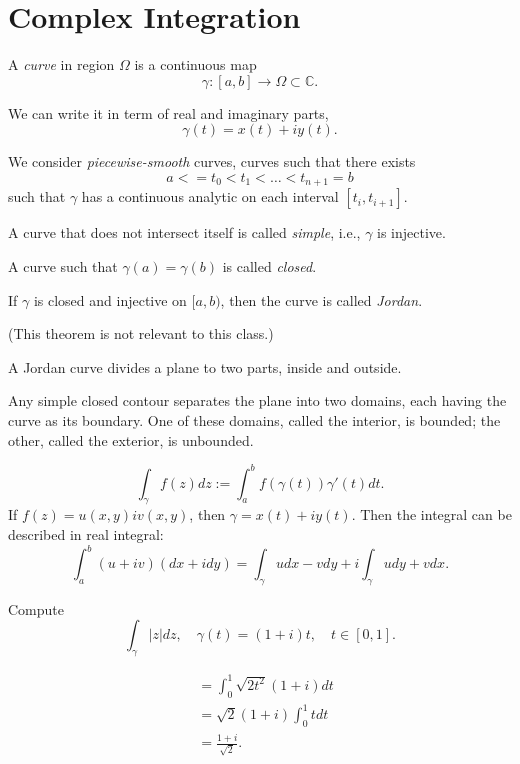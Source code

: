 \section{Complex Integration}

A \textit{curve} in region $\Omega$ is a continuous map \[
	\gamma: [a,b] \to  \Omega \subset \mathbb{C}
.\] 

We can write it in term of real and imaginary parts, 
\[
	\gamma(t) = x(t) + i y(t)
.\] 

We consider \textit{piecewise-smooth} curves, curves such that there exists \[
	a < = t_0 < t_1 < \ldots < t_{n+1} = b
\] such that $\gamma$ has a continuous analytic on each interval $[t_i, t_{i+1}]$.

A curve that does not intersect itself is called \textit{simple}, i.e., $\gamma$ is injective.

A curve such that $\gamma(a) = \gamma(b)$ is called \textit{closed}.

If $\gamma$ is closed and injective on $[a,b)$, then the curve is called \textit{Jordan}.

(This theorem is not relevant to this class.)
\begin{theorem}
	A Jordan curve divides a plane to two parts, inside and outside.

	Any simple closed contour separates the plane into two domains, each having the curve as its boundary. One of these domains, called the interior, is bounded; the other, called the exterior, is unbounded.
\end{theorem}

\begin{definition}
\[
	\int_\gamma f(z) dz := \int_a^b f(\gamma(t))\gamma'(t)dt
.\] 
If $f(z) = u(x,y) i v(x,y)$, then $\gamma = x(t) + i y(t)$. Then the integral can be described in real integral:
\[
	\int_a^b (u + i v)(dx + i dy) = \int_\gamma u dx - v dy + i\int_\gamma udy + v dx 
.\] 
\end{definition}

\begin{example}
	Compute \[
		\int_\gamma |z| dz, \quad \gamma (t) = (1+i)t, \quad t \in [0,1]
	.\] 

	\begin{align*}
		&= \int _0^1 \sqrt{2 t^2}(1+i)dt  \\
		&= \sqrt{2} (1+i) \int _0^1 t dt \\
		&= \frac{1+i}{\sqrt{2} }
	.\end{align*}
\end{example}


